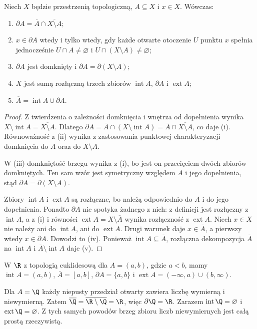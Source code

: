 \begin{twierdzenie}
\label{thm:topog-charakteryzacja-brzegu}
Niech $X$ będzie przestrzenią topologiczną,
$A\subseteq X$ i $x\in X$. Wówczas:
\begin{enumerate}[label=(\roman*)]
\item $\partial A=\overline A\cap\overline{X\setminus A}$;
\item $x\in\partial A$ wtedy i tylko wtedy, gdy każde
      otwarte otoczenie $U$ punktu $x$ spełnia jednocześnie
      $U\cap A\ne\varnothing$ i
      $U\cap(X\setminus A)\ne\varnothing$;
\item $\partial A$ jest domknięty i
      $\partial A=\partial(X\setminus A)$;
\item $X$ jest sumą rozłączną trzech zbiorów
      $\operatorname{int}A$, $\partial A$ i
      $\operatorname{ext}A$;
\item $\overline A=\operatorname{int}A\cup\partial A$.
\end{enumerate}
\end{twierdzenie}
\begin{proof}
Z twierdzenia o zależności domknięcia i wnętrza od dopełnienia
wynika $X\setminus\operatorname{int}A=\overline{X\setminus A}$.
Dlatego $\partial A=\overline A\cap(X\setminus\operatorname{int}A)
=\overline A\cap\overline{X\setminus A}$, co daje (i).
Równoważność z (ii) wynika z zastosowania punktowej
charakteryzacji domknięcia do $A$ oraz do $X\setminus A$.

W (iii) domkniętość brzegu wynika z (i), bo jest on
przecięciem dwóch zbiorów domkniętych.
Ten sam wzór jest symetryczny względem $A$ i jego
dopełnienia, stąd $\partial A=\partial(X\setminus A)$.

Zbiory $\operatorname{int}A$ i $\operatorname{ext}A$
są rozłączne, bo należą odpowiednio do $A$ i do jego dopełnienia.
Ponadto $\partial A$ nie spotyka żadnego z nich:
z definicji jest rozłączny z $\operatorname{int}A$,
a z (i) i równości
$\operatorname{ext}A=X\setminus\overline A$
wynika rozłączność z $\operatorname{ext}A$.
Niech $x\in X$ nie należy ani do $\operatorname{int}A$,
ani do $\operatorname{ext}A$. Drugi warunek daje
$x\in\overline A$, a pierwszy wtedy $x\in\partial A$.
Dowodzi to (iv). Ponieważ $\operatorname{int}A\subseteq\overline A$,
rozłączna dekompozycja $\overline A$ na
$\operatorname{int}A$ i $\overline A\setminus\operatorname{int}A$
daje (v).
\end{proof}

\begin{przyklad}
\label{ex:topog-brzeg-przyklady}
W $\R$ z topologią euklidesową dla $A=(a,b)$, gdzie $a<b$,
mamy $\operatorname{int}A=(a,b)$, $\overline A=[a,b]$,
$\partial A=\{a,b\}$ i
$\operatorname{ext}A=(-\infty,a)\cup(b,\infty)$.

Dla $A=\Q$ każdy niepusty przedział otwarty zawiera
liczbę wymierną i niewymierną. Zatem
$\overline\Q=\overline{\R\setminus\Q}=\R$, więc
$\partial\Q=\R$. Zarazem $\operatorname{int}\Q=\varnothing$
i $\operatorname{ext}\Q=\varnothing$.
Z tych samych powodów brzeg zbioru liczb niewymiernych
jest całą prostą rzeczywistą.
\end{przyklad}

